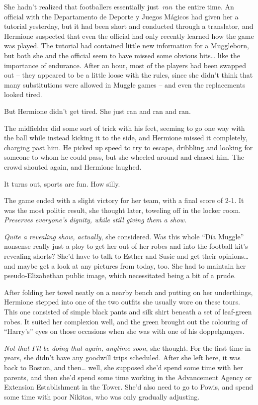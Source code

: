 She hadn't realized that footballers essentially just~\emph{ran}~the
entire time. An official with the Departamento de Deporte y Juegos
Mágicos had given her a tutorial yesterday, but it had been short and
conducted through a translator, and Hermione suspected that even the
official had only recently learned how the game was played. The tutorial
had contained little new information for a Muggleborn, but both she and
the official seem to have missed some obvious bits\ldots{} like the
importance of endurance. After an hour, most of the players had been
swapped out -- they appeared to be a little loose with the rules, since
she didn't think that many substitutions were allowed in Muggle games --
and even the replacements looked tired.

But Hermione didn't get tired. She just ran and ran and ran.

The midfielder did some sort of trick with his feet, seeming to go one
way with the ball while instead kicking it to the side, and Hermione
missed it completely, charging past him. He picked up speed to try to
escape, dribbling and looking for someone to whom he could pass, but she
wheeled around and chased him. The crowd shouted again, and Hermione
laughed.

It turns out, sports are fun. How silly.

The game ended with a slight victory for her team, with a final score of
2-1. It was the most politic result, she thought later, toweling off in
the locker room. \emph{Preserves everyone's dignity, while still giving
them a show.}

\emph{Quite a revealing show, actually}, she considered. Was this whole
``Día Muggle'' nonsense really just a ploy to get her out of her robes
and into the football kit's revealing shorts? She'd have to talk to
Esther and Susie and get their opinions\ldots{} and maybe get a look at
any pictures from today, too. She had to maintain her pseudo-Elizabethan
public image, which necessitated being a bit of a prude.

After folding her towel neatly on a nearby bench and putting on her
underthings, Hermione stepped into one of the two outfits she usually
wore on these tours. This one consisted of simple black pants and silk
shirt beneath a set of leaf-green robes. It suited her complexion well,
and the green brought out the colouring of ``Harry's'' eyes on those
occasions when she was with one of his doppelgangers.

\emph{Not that I'll be doing that again, anytime soon}, she thought. For
the first time in years, she didn't have any goodwill trips scheduled.
After she left here, it was back to Boston, and then\ldots{} well, she
supposed she'd spend some time with her parents, and then she'd spend
some time working in the Advancement Agency or Extension Establishment
in the Tower. She'd also need to go to Powis, and spend some time with
poor Nikitas, who was only gradually adjusting.

